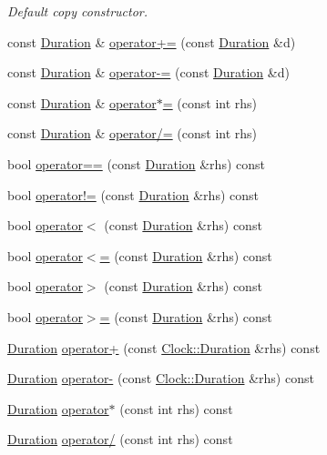 \begin{DoxyCompactItemize}
\begin{DoxyCompactList}\small\item\em Default copy constructor. \end{DoxyCompactList}\item 
const \hyperlink{class_clock_1_1_duration}{Duration} \& \hyperlink{class_clock_1_1_duration_a26e61beba69d48791344c4ad41cfba24}{operator+=} (const \hyperlink{class_clock_1_1_duration}{Duration} \&d)
\item 
const \hyperlink{class_clock_1_1_duration}{Duration} \& \hyperlink{class_clock_1_1_duration_adcaee82baaaf942f67483582c7e1f1e6}{operator-\/=} (const \hyperlink{class_clock_1_1_duration}{Duration} \&d)
\item 
const \hyperlink{class_clock_1_1_duration}{Duration} \& \hyperlink{class_clock_1_1_duration_a88c694eff07a588782593d4617482919}{operator$\ast$=} (const int rhs)
\item 
const \hyperlink{class_clock_1_1_duration}{Duration} \& \hyperlink{class_clock_1_1_duration_a60cab1e0be9e835a05a4b81eb792abe2}{operator/=} (const int rhs)
\item 
bool \hyperlink{class_clock_1_1_duration_afeeb3847f2147769416471892ef04af9}{operator==} (const \hyperlink{class_clock_1_1_duration}{Duration} \&rhs) const 
\item 
bool \hyperlink{class_clock_1_1_duration_a1af85a78ef8095c649379336f8ae8bcc}{operator!=} (const \hyperlink{class_clock_1_1_duration}{Duration} \&rhs) const 
\item 
bool \hyperlink{class_clock_1_1_duration_ac605b0e00447315bafb9c6a787779d78}{operator$<$} (const \hyperlink{class_clock_1_1_duration}{Duration} \&rhs) const 
\item 
bool \hyperlink{class_clock_1_1_duration_af1c12774f3a82539a559e59e666ccdfe}{operator$<$=} (const \hyperlink{class_clock_1_1_duration}{Duration} \&rhs) const 
\item 
bool \hyperlink{class_clock_1_1_duration_a34de110bc0e3decf11477963d4fc0091}{operator$>$} (const \hyperlink{class_clock_1_1_duration}{Duration} \&rhs) const 
\item 
bool \hyperlink{class_clock_1_1_duration_af36b0327c8d39df60c992927ef6cd181}{operator$>$=} (const \hyperlink{class_clock_1_1_duration}{Duration} \&rhs) const 
\item 
\hyperlink{class_clock_1_1_duration}{Duration} \hyperlink{class_clock_1_1_duration_a736c29f90be11973e96cef8b90bb3cff}{operator+} (const \hyperlink{class_clock_1_1_duration}{Clock\+::\+Duration} \&rhs) const 
\item 
\hyperlink{class_clock_1_1_duration}{Duration} \hyperlink{class_clock_1_1_duration_ae3a7fadb1696d6997da5d4eb6d6c20f1}{operator-\/} (const \hyperlink{class_clock_1_1_duration}{Clock\+::\+Duration} \&rhs) const 
\item 
\hyperlink{class_clock_1_1_duration}{Duration} \hyperlink{class_clock_1_1_duration_aeb9a3ad2c7e98006f00ce9db1fbd57f5}{operator$\ast$} (const int rhs) const 
\item 
\hyperlink{class_clock_1_1_duration}{Duration} \hyperlink{class_clock_1_1_duration_a314a0d6b462c12f984a6700330227dfe}{operator/} (const int rhs) const 
\end{DoxyCompactItemize}
